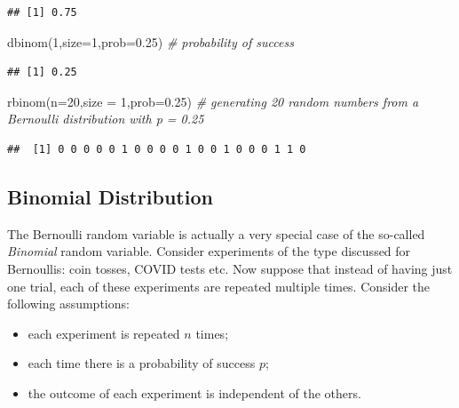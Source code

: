 \documentclass[
]{book}
\newenvironment{Shaded}{\begin{snugshade}}{\end{snugshade}}
\newcommand{\AttributeTok}[1]{\textcolor[rgb]{0.77,0.63,0.00}{#1}}
\newcommand{\CommentTok}[1]{\textcolor[rgb]{0.56,0.35,0.01}{\textit{#1}}}
\newcommand{\DecValTok}[1]{\textcolor[rgb]{0.00,0.00,0.81}{#1}}
\newcommand{\FloatTok}[1]{\textcolor[rgb]{0.00,0.00,0.81}{#1}}
\newcommand{\FunctionTok}[1]{\textcolor[rgb]{0.00,0.00,0.00}{#1}}
\newcommand{\NormalTok}[1]{#1}
\theoremstyle{definition}
\theoremstyle{definition}
\theoremstyle{definition}
\theoremstyle{definition}
\theoremstyle{remark}
\begin{document}
\begin{verbatim}
## [1] 0.75
\end{verbatim}

\begin{Shaded}
\begin{Highlighting}[]
\FunctionTok{dbinom}\NormalTok{(}\DecValTok{1}\NormalTok{,}\AttributeTok{size=}\DecValTok{1}\NormalTok{,}\AttributeTok{prob=}\FloatTok{0.25}\NormalTok{) }\CommentTok{\# probability of success}
\end{Highlighting}
\end{Shaded}

\begin{verbatim}
## [1] 0.25
\end{verbatim}

\begin{Shaded}
\begin{Highlighting}[]
\FunctionTok{rbinom}\NormalTok{(}\AttributeTok{n=}\DecValTok{20}\NormalTok{,}\AttributeTok{size =} \DecValTok{1}\NormalTok{,}\AttributeTok{prob=}\FloatTok{0.25}\NormalTok{) }\CommentTok{\# generating 20 random numbers from a Bernoulli distribution with p = 0.25}
\end{Highlighting}
\end{Shaded}

\begin{verbatim}
##  [1] 0 0 0 0 0 1 0 0 0 0 1 0 0 1 0 0 0 1 1 0
\end{verbatim}

\hypertarget{binomial-distribution}{%
\subsection{Binomial Distribution}\label{binomial-distribution}}

The Bernoulli random variable is actually a very special case of the so-called \emph{Binomial} random variable. Consider experiments of the type discussed for Bernoullis: coin tosses, COVID tests etc. Now suppose that instead of having just one trial, each of these experiments are repeated multiple times. Consider the following assumptions:

\begin{itemize}
\item
  each experiment is repeated \(n\) times;
\item
  each time there is a probability of success \(p\);
\item
  the outcome of each experiment is independent of the others.
\end{itemize}
\end{document}
